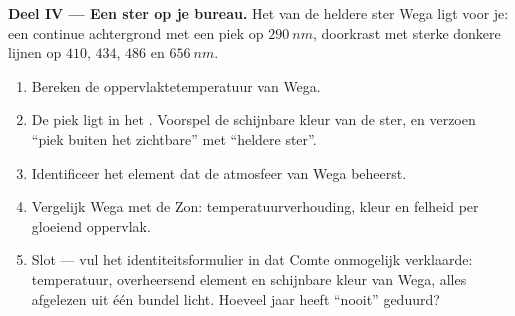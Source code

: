 \begin{problem}
\medskip
\noindent\textbf{Deel IV --- Een ster op je bureau.}
Het  van de heldere ster Wega ligt voor je: een continue
achtergrond met een piek op $\qty{290}{nm}$, doorkrast met sterke donkere
lijnen op $410$, $434$, $486$ en $\qty{656}{nm}$.
\begin{enumerate}[resume]
  \item Bereken de oppervlaktetemperatuur van Wega.
  \item De piek ligt in het . Voorspel de schijnbare kleur van
        de ster, en verzoen ``piek buiten het zichtbare'' met ``heldere
        ster''.
  \item Identificeer het element dat de atmosfeer van Wega beheerst.
  \item Vergelijk Wega met de Zon: temperatuurverhouding, kleur en
        felheid per  gloeiend oppervlak.
  \item Slot --- vul het identiteitsformulier in dat Comte onmogelijk
        verklaarde: temperatuur, overheersend element en schijnbare kleur
        van Wega, alles afgelezen uit één bundel licht. Hoeveel jaar
        heeft ``nooit'' geduurd?
\end{enumerate}
\end{problem}
